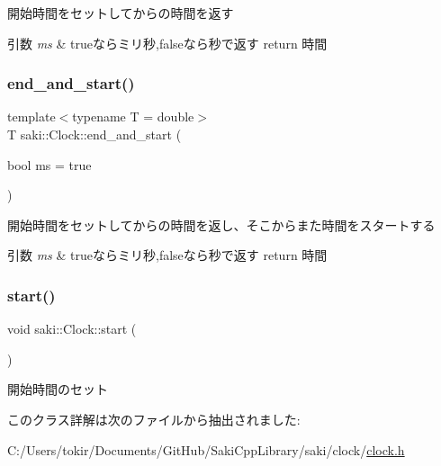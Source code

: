開始時間をセットしてからの時間を返す 


\begin{DoxyParams}{引数}
{\em ms} & trueならミリ秒,falseなら秒で返す return 時間 \\
\hline
\end{DoxyParams}
\mbox{\label{classsaki_1_1_clock_a6df6705089065ac8f9f3cdb718d7284f}} 
\subsubsection{\texorpdfstring{end\+\_\+and\+\_\+start()}{end\_and\_start()}}
{\footnotesize\ttfamily template$<$typename T  = double$>$ \\
T saki\+::\+Clock\+::end\+\_\+and\+\_\+start (\begin{DoxyParamCaption}\item[{bool}]{ms = {\ttfamily true} }\end{DoxyParamCaption})\hspace{0.3cm}{\ttfamily [inline]}}



開始時間をセットしてからの時間を返し、そこからまた時間をスタートする 


\begin{DoxyParams}{引数}
{\em ms} & trueならミリ秒,falseなら秒で返す return 時間 \\
\hline
\end{DoxyParams}
\mbox{\label{classsaki_1_1_clock_a522e7d5dcae1f457dfc1cd4eb9560cec}} 
\subsubsection{\texorpdfstring{start()}{start()}}
{\footnotesize\ttfamily void saki\+::\+Clock\+::start (\begin{DoxyParamCaption}{ }\end{DoxyParamCaption})\hspace{0.3cm}{\ttfamily [inline]}}



開始時間のセット 



このクラス詳解は次のファイルから抽出されました\+:\begin{DoxyCompactItemize}
\item 
C\+:/\+Users/tokir/\+Documents/\+Git\+Hub/\+Saki\+Cpp\+Library/saki/clock/\mbox{\hyperlink{clock_8h}{clock.\+h}}\end{DoxyCompactItemize}
